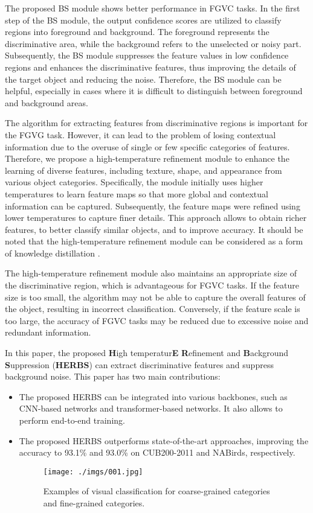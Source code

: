 \documentclass[journal]{IEEEtran}
\begin{document}
The proposed BS module shows better performance in FGVC tasks. In the first step of the BS module, the output confidence scores are utilized to classify regions into foreground and background. The foreground represents the discriminative area, while the background refers to the unselected or noisy part. Subsequently, the BS module suppresses the feature values in low confidence regions and enhances the discriminative features, thus improving the details of the target object and reducing the noise. Therefore, the BS module can be helpful, especially in cases where it is difficult to distinguish between foreground and background areas.

The algorithm for extracting features from discriminative regions is important for the FGVG task. However, it can lead to the problem of losing contextual information due to the overuse of single or few specific categories of features. Therefore, we propose a high-temperature refinement module to enhance the learning of diverse features, including texture, shape, and appearance from various object categories. Specifically, the module initially uses higher temperatures to learn feature maps so that more global and contextual information can be captured. Subsequently, the feature maps were refined using lower temperatures to capture finer details. This approach allows to obtain richer features, to better classify similar objects, and to improve accuracy. It should be noted that the high-temperature refinement module can be considered as a form of knowledge distillation \cite{KD}.

The high-temperature refinement module also maintains an appropriate size of the discriminative region, which is advantageous for FGVC tasks. If the feature size is too small, the algorithm may not be able to capture the overall features of the object, resulting in incorrect classification. Conversely, if the feature scale is too large, the accuracy of FGVC tasks may be reduced due to excessive noise and redundant information.

In this paper, the proposed \textbf{H}igh temperatur\textbf{E} \textbf{R}efinement and \textbf{B}ackground \textbf{S}uppression (\textbf{HERBS}) can extract discriminative features and suppress background noise. This paper has two main contributions:
\begin{itemize}
\item  The proposed HERBS can be integrated into various backbones, such as CNN-based networks and transformer-based networks. It also allows to perform end-to-end training.
\item The proposed HERBS outperforms state-of-the-art approaches, improving the accuracy to 93.1\% and 93.0\% on CUB200-2011\cite{CUB_200_2011} and NABirds\cite{NA-Birds}, respectively.
\begin{figure}[t]
    \begin{center}
    \texttt{[image: ./imgs/001.jpg]}
    \end{center}
\caption{Examples of visual classification for coarse-grained categories and fine-grained categories.}
\label{fig:ex_coarse_fine}
\end{figure}
\end{itemize}
\end{document}
